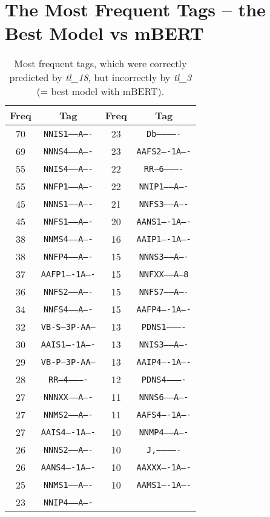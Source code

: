 \section{The Most Frequent Tags -- the Best Model vs mBERT }
\label{att:tags2}
\begin{table}[!h]
\centering
\begin{tabular}{|c|c||c|c|}
\hline
Freq & Tag & Freq & Tag \\ \hline \hline
70 & \texttt{NNIS1-----A----} & 23 & \texttt{Db-------------}   \\
69 & \texttt{NNNS4-----A----} & 23 & \texttt{AAFS2----1A----}   \\
55 & \texttt{NNIS4-----A----} & 22 & \texttt{RR--6----------}  \\
55 & \texttt{NNFP1-----A----} & 22 & \texttt{NNIP1-----A----}  \\
45 & \texttt{NNNS1-----A----} & 21 & \texttt{NNFS3-----A----}   \\
45 & \texttt{NNFS1-----A----} & 20 & \texttt{AANS1----1A----}   \\
38 & \texttt{NNMS4-----A----} & 16 & \texttt{AAIP1----1A----}   \\
38 & \texttt{NNFP4-----A----} & 15 & \texttt{NNNS3-----A----}   \\
37 & \texttt{AAFP1----1A----} & 15 & \texttt{NNFXX-----A---8}   \\
36 & \texttt{NNFS2-----A----} & 15 & \texttt{NNFS7-----A----}  \\
34 & \texttt{NNFS4-----A----} & 15 & \texttt{AAFP4----1A----}   \\
32 & \texttt{VB-S---3P-AA---} & 13 & \texttt{PDNS1----------}  \\
30 & \texttt{AAIS1----1A----} & 13 & \texttt{NNIS3-----A----}  \\
29 & \texttt{VB-P---3P-AA---} & 13 & \texttt{AAIP4----1A----}   \\
28 & \texttt{RR--4----------} & 12 & \texttt{PDNS4----------}   \\
27 & \texttt{NNNXX-----A----} & 11 & \texttt{NNNS6-----A----}   \\
27 & \texttt{NNMS2-----A----} & 11 & \texttt{AAFS4----1A----}   \\
27 & \texttt{AAIS4----1A----} & 10 & \texttt{NNMP4-----A----}   \\
26 & \texttt{NNNS2-----A----} & 10 & \texttt{J,-------------}   \\
26 & \texttt{AANS4----1A----} & 10 & \texttt{AAXXX----1A----}   \\
25 & \texttt{NNMS1-----A----} & 10 & \texttt{AAMS1----1A----}   \\
23 & \texttt{NNIP4-----A----} &  &   \\ \hline             
\end{tabular}
\caption{Most frequent tags, which were correctly predicted by \textit{tl\_18}, but incorrectly by \textit{tl\_3} (= best model with mBERT).}
\end{table}